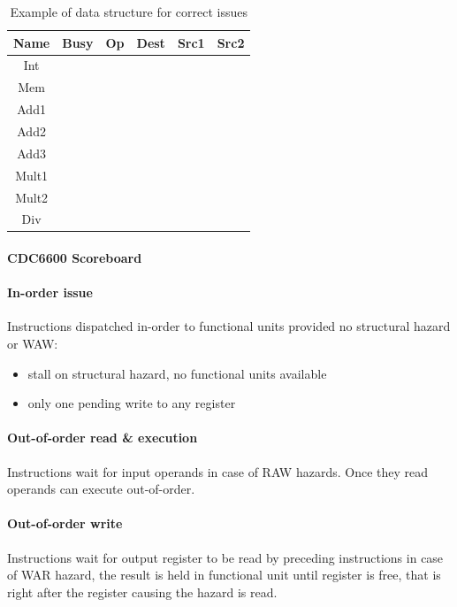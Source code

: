 \begin{table}[h]
    \centering
    \begin{tabular}{c|c|cccc}
        \toprule
        \textbf{Name} & \textbf{Busy} & \textbf{Op} & \textbf{Dest} & \textbf{Src1} & \textbf{Src2} \\
        \midrule
        Int &  &  &  &  &  \\
        Mem &  &  &  &  &  \\
        \midrule
        Add1 &  &  &  &  &  \\
        Add2 &  &  &  &  &  \\
        Add3 &  &  &  &  &  \\
        \midrule
        Mult1 &  &  &  &  &  \\
        Mult2 &  &  &  &  &  \\
        \midrule
        Div &  &  &  &  &  \\
        \bottomrule
    \end{tabular}
    \caption{Example of data structure for correct issues}
    \label{tab:scoreboard-data-structure}
\end{table}

\paragraph{CDC6600 Scoreboard}
\paragraph{In-order issue} Instructions dispatched in-order to functional units provided no structural hazard or WAW:
\begin{itemize}
    \item stall on structural hazard, no functional units available
    \item only one pending write to any register
\end{itemize}

\paragraph{Out-of-order read \& execution} Instructions wait for input operands in case of RAW hazards.
Once they read operands can execute out-of-order.

\paragraph{Out-of-order write} Instructions wait for output register to be read by preceding instructions in case
of WAR hazard, the result is held in functional unit until register is free, that is right after the register causing
the hazard is read.

